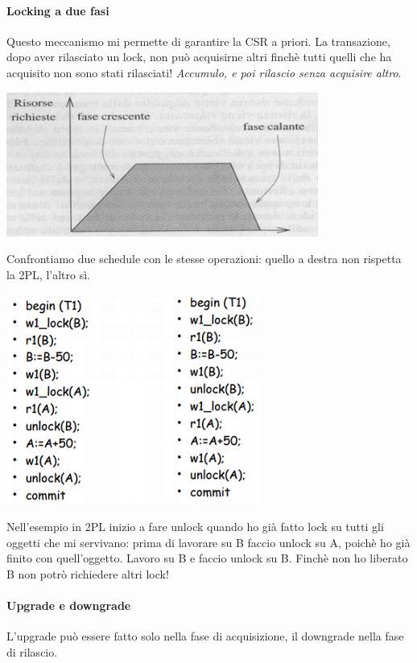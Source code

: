 \paragraph{Locking a due fasi} Questo meccanismo mi permette di garantire la CSR a priori. La transazione, dopo aver rilasciato un lock, non può acquisirne altri finchè tutti quelli che ha acquisito non sono stati rilasciati! \textit{Accumulo, e poi rilascio senza acquisire altro}. 
\begin{center}\includegraphics{images/165.PNG}\end{center}
Confrontiamo due schedule con le stesse operazioni: quello a destra non rispetta la 2PL, l'altro sì.
\begin{center}\includegraphics{images/164.PNG}\end{center}
Nell'esempio in 2PL inizio a fare unlock quando ho già fatto lock su tutti gli oggetti che mi servivano: prima di lavorare su B faccio unlock su A, poichè ho già finito con quell'oggetto. Lavoro su B e faccio unlock su B. Finchè non ho liberato B non potrò richiedere altri lock!
\paragraph{Upgrade e downgrade} L'upgrade può essere fatto solo nella fase di acquisizione, il downgrade nella fase di rilascio.
